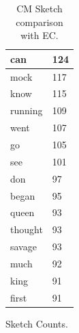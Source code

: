 \documentclass[shortpaper]{revdetua}
\begin{document}
\begin{table}[!htb]
\begin{subtable}{.5\linewidth}
\begin{tabular}{|l|l|}
            can     & 124    \\ \hline
            mock    & 117    \\ \hline
            know    & 115    \\ \hline
            running & 109    \\ \hline
            went    & 107    \\ \hline
            go      & 105    \\ \hline
            see     & 101    \\ \hline
            don     & 97     \\ \hline
            began   & 95     \\ \hline
            queen   & 93     \\ \hline
            thought & 93     \\ \hline
            savage  & 93     \\ \hline
            much    & 92     \\ \hline
            king    & 91     \\ \hline
            first   & 91     \\ \hline
        \end{tabular}
        \caption{Sketch Counts.}
    \end{subtable} 
    \caption{CM Sketch comparison with EC.}
    \label{tab:1}
\end{table}
\end{document}
